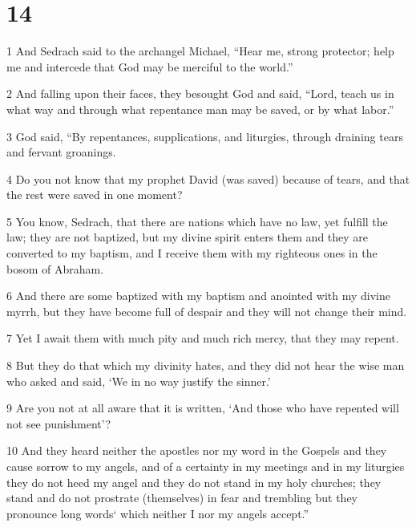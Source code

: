\chapter{14}

\par 1 And Sedrach said to the archangel Michael, “Hear me, strong protector; help me and intercede that God may be merciful to the world.” 

\par 2 And falling upon their faces, they besought God and said, “Lord, teach us in what way and through what repentance man may be saved, or by what labor.” 

\par 3 God said, “By repentances, supplications, and liturgies, through draining tears and fervant groanings. 

\par 4 Do you not know that my prophet David (was saved) because of tears, and that the rest were saved in one moment? 

\par 5 You know, Sedrach, that there are nations which have no law, yet fulfill the law; they are not baptized, but my divine spirit enters them and they are converted to my baptism, and I receive them with my righteous ones in the bosom of Abraham. 

\par 6 And there are some baptized with my baptism and anointed with my divine myrrh, but they have become full of despair and they will not change their mind. 

\par 7 Yet I await them with much pity and much rich mercy, that they may repent. 

\par 8 But they do that which my divinity hates, and they did not hear the wise man who asked and said, ‘We in no way justify the sinner.’ 

\par 9 Are you not at all aware that it is written, ‘And those who have repented will not see punishment’?

\par 10 And they heard neither the apostles nor my word in the Gospels and they cause sorrow to my angels, and of a certainty in my meetings and in my liturgies they do not heed my angel and they do not stand in my holy churches; they stand and do not prostrate (themselves) in fear and trembling but they pronounce long words‘ which neither I nor my angels accept.” 

